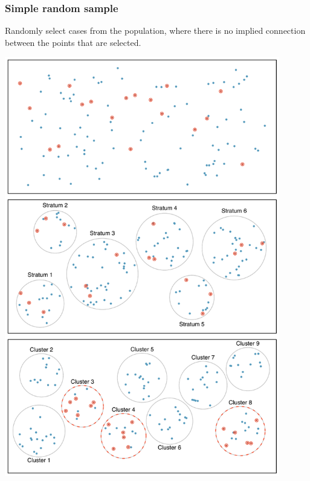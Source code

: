 
\begin{frame}
\frametitle{Simple random sample}

Randomly select cases from the population, where there is no implied connection between the points that are selected.

\begin{center}
\includegraphics[width=0.9\textwidth]{1-4_obs_studies_sampling/figures/sampling_methods/srs}
\end{center}

\end{frame}


